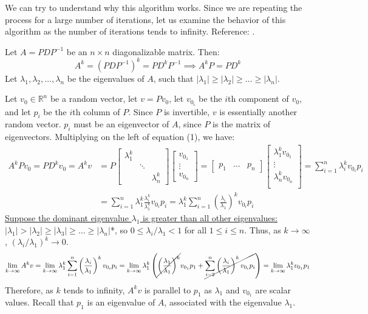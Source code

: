 \documentclass{article}
\begin{document}
We can try to understand why this algorithm works. Since we are repeating the process for a large number of iterations, let us examine the behavior of this algorithm as the number of iterations tends to infinity. Reference: \cite{cornellnotes}.

Let $A=PDP^{-1}$ be an $n\times n$ diagonalizable matrix. Then:
\begin{equation}
	A^k
	=\left(PDP^{-1}\right)^k
	=PD^{k}P^{-1} \implies A^kP=PD^k
\end{equation}
Let $\lambda_1,\lambda_2,\ldots,\lambda_n$ be the eigenvalues of $A$, such that $\left|\lambda_1\right|\geq \left|\lambda_2\right|\geq \ldots\geq \left|\lambda_n\right|$.

Let $v_0\in\mathbb R^n$ be a random vector, let $v=Pv_0$, let $v_{0_i}$ be the $i$th component of $v_0$, and let $p_i$ be the $i$th column of $P$. Since $P$ is invertible, $v$ is essentially another random vector. $p_i$ must be an eigenvector of $A$, since $P$ is the matrix of eigenvectors. Multiplying on the left of equation (1), we have:
\begin{align*}
	A^kPv_0=PD^kv_0
	=A^k v 
	&= P \begin{bmatrix}
		\lambda_1^k & & \\
		& \ddots & \\
		& & \lambda_n^k
	\end{bmatrix}
	\begin{bmatrix}
		v_{0_1} \\ \vdots \\ v_{0_n}
	\end{bmatrix}
	=\begin{bmatrix}
		p_1 & \ldots & p_n
	\end{bmatrix} \begin{bmatrix}
		\lambda_1^k v_{0_1} \\ 
		\vdots \\
		\lambda_n^k v_{0_n} \\ 
	\end{bmatrix}
	=\sum_{i=1}^{n}\lambda_i^k v_{0_i} p_i \\
	&=\sum_{i=1}^{n}\lambda_1^k\frac{\lambda_i^k}{\lambda_1^k} v_{0_i} p_i
	=\lambda_1^k \sum_{i=1}^{n}\left(\frac{\lambda_i}{\lambda_1}\right)^k v_{0_i}p_i
\end{align*}
\ul{Suppose the dominant eigenvalue $\lambda_1$ is greater than all other eigenvalues: $\left|\lambda_1\right|>\left|\lambda_2\right|\geq \left|\lambda_3\right|\geq\ldots\geq \left|\lambda_n\right|$}*, so $0\leq\lambda_i/\lambda_1<1$ for all $1\leq i\leq n$. Thus, as $k\to\infty$, $\left(\lambda_i/\lambda_1\right)^k\to0$.
\begin{equation*}
    \lim_{k\to\infty}A^kv
	=\lim_{k\to\infty}\lambda_1^k \sum_{i=1}^{n}\left(\frac{\lambda_i}{\lambda_1}\right)^k v_{0_i}p_i
	=\lim_{k\to\infty}\lambda_1^k \left(\cancel{\left(\frac{\lambda_1}{\lambda_1}\right)^k} v_{0_1}p_1+\cancel{\sum_{i=2}^{n}\left(\frac{\lambda_i}{\lambda_1}\right)^k v_{0_i}p_i}\right)
	=\lim_{k\to\infty}\lambda_1^k v_{0_1}{p_1}
\end{equation*}
Therefore, as $k$ tends to infinity, $A^kv$ is parallel to $p_1$ as $\lambda_1$ and $v_{0_1}$ are scalar values. Recall that $p_1$ is an eigenvalue of $A$, associated with the eigenvalue $\lambda_1$.
\end{document}
